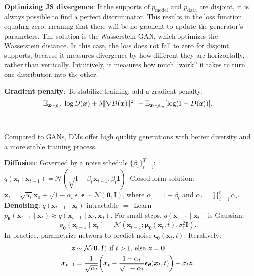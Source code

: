 \documentclass{article}
\newcommand{\lft}{\mathopen{}\mathclose\bgroup\left}
\newcommand{\rgt}{\aftergroup\egroup\right}
\newcommand{\E}{\mathbb{E}}
\renewcommand{\vec}[1]{\bm{#1}}
\newcommand{\mat}[1]{\bm{#1}}
\newenvironment{topic}[1]
{\textbf{\sffamily \colorbox{black}{\rlap{\textbf{\textcolor{white}{#1}}}\hspace{\linewidth}\hspace{-2\fboxsep}}} \\ \vspace{0.2cm}}
{}
\begin{document}
\begin{multicols*}{2}
\begin{topic}{Generative adversarial network}
        \textbf{Optimizing JS divergence}: If the supports of
        $p_{\mathrm{model}}$ and $p_{\mathrm{data}}$ are disjoint, it is always possible to find a
        perfect discriminator. This results in the loss function equaling zero, meaning that there
        will be no gradient to update the generator's parameters. The solution is the Wasserstein
        GAN, which optimizes the Wasserstein distance. In this case, the loss does not fall to zero
        for disjoint supports, because it measures divergence by how different they are horizontally,
        rather than vertically. Intuitively, it measures how much “work” it takes to turn one
        distribution into the other.

        \textbf{Gradient penalty}: To stabilize training, add a gradient penalty: \[
            \E_{\vec{x} \sim p_d} \lft[ \log D(\vec{x}) + \lambda \| \nabla D(\vec{x}) \|^2 \rgt] + \E_{\vec{x} \sim p_m} [\log (1 - D(\vec{x}))].
        \]

    \end{topic}

    \begin{topic}{Diffusion models}

        Compared to GANs, DMs offer high quality generations with better diversity and a more stable
        training process.

        \textbf{Diffusion}: Governed by a noise schedule $\{ \beta_t \}_{t=1}^T$: $q(\vec{x}_t \mid \vec{x}_{t-1}) = \mathcal{N}(\sqrt{1 - \beta_t} \vec{x}_{t-1}, \beta_t \mat{I})$.
        Closed-form solution: $\vec{x}_t = \sqrt{\bar{\alpha}_t} \vec{x}_0 + \sqrt{1 - \bar{\alpha}_t} \vec{\epsilon}, \vec{\epsilon} \sim \mathcal{N}(\vec{0}, \mat{I})$,
        where $\alpha_t = 1 - \beta_t$ and $\bar{\alpha}_t = \prod_{i=1}^t \alpha_i$. \\
        \textbf{Denoising}: $q(\vec{x}_{t-1} \mid \vec{x}_t)$ intractable $\Rightarrow$ Learn $p_{\vec{\theta}}(\vec{x}_{t-1} \mid \vec{x}_t) \approx
            q(\vec{x}_{t-1} \mid \vec{x}_t, \vec{x}_0)$. For small steps, $q(\vec{x}_{t-1} \mid \vec{x}_t)$
        is Gaussian: \[
            p_{\vec{\theta}}(\vec{x}_{t-1} \mid \vec{x}_t) = \mathcal{N}(\vec{x}_{t-1} ; \vec{\mu}_{\vec{\theta}}(\vec{x}_t, t), \sigma_t^2 \mat{I}).
        \]
        In practice, parametrize network to predict noise $\vec{\epsilon}_{\vec{\theta}}(\vec{x}_t, t)$.
        Iteratively:
        \begin{align*}
            \vec{z}       & \sim \mathcal{N}(\vec{0}, \mat{I}) \text{ if $t > 1$, else $\vec{z} = \vec{0}$}                                                                                    \\
            \vec{x}_{t-1} & = \frac{1}{\sqrt{\alpha_t}} \lft( \vec{x}_t - \frac{1 - \alpha_t}{\sqrt{1 - \bar{\alpha}_t}} \vec{\epsilon}_{\vec{\theta}}(\vec{x}_t, t) \rgt) + \sigma_t \vec{z}.
        \end{align*}


\end{topic}
\end{multicols*}
\end{document}
